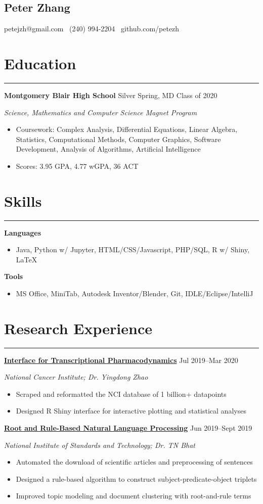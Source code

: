 \documentclass[11pt]{article}
\newcommand{\name}[1]{\begin{center}\section*{\huge \color{highlight} #1}\end{center}}
\newcommand{\topinfo}[1]{\begin{center}\vspace{-0.2cm}#1\vspace{-0.2cm}\end{center}}
\newcommand{\resumesection}[1]{\vspace{-0.3cm}\section*{\color{highlight}#1}\vspace{-0.3cm}\hrule\vspace{0.3cm}}
\begin{document}
\name{Peter Zhang}
\topinfo{petejzh@gmail.com \textbullet\ (240) 994-2204 \textbullet\ github.com/petezh}

\resumesection{Education}

\textbf{Montgomery Blair High School} Silver Spring, MD \hfill Class of 2020 \par
\textit{Science, Mathematics and Computer Science Magnet Program}

\begin{itemize}
	\item Coursework: Complex Analysis, Differential Equations, Linear Algebra, Statistics, Computational Methods, Computer Graphics, Software Development, Analysis of Algorithms, Artificial Intelligence
	\item Scores: 3.95 GPA, 4.77 wGPA, 36 ACT
\end{itemize}


\resumesection{Skills}

\textbf{Languages}
\begin{itemize} 
	\item Java, Python w/ Jupyter, HTML/CSS/Javascript, PHP/SQL, R w/ Shiny, \LaTeX
\end{itemize}\vspace{0.1cm}


\textbf{Tools}
\begin{itemize} 
	\item MS Office, MiniTab, Autodesk Inventor/Blender, Git, IDLE/Eclipse/IntelliJ
\end{itemize}

\resumesection{Research Experience}


\textbf{\href{https://github.com/petezh/TP-Workbench}{Interface for Transcriptional Pharmacodynamics}} \hfill Jul 2019--Mar 2020 \par
\textit{National Cancer Institute; Dr. Yingdong Zhao}
\begin{itemize}
	\item Scraped and reformatted the NCI database of 1 billion+ datapoints
	\item Designed R Shiny interface for interactive plotting and statistical analyses
\end{itemize}\vspace{0.1cm}

\textbf{\href{https://github.com/petezh/Root-and-Rule-NLP}{Root and Rule-Based Natural Language Processing}} \hfill Jun 2019--Sept 2019\par
\textit{National Institute of Standards and Technology; Dr. TN Bhat}
\begin{itemize}
	\item Automated the download of scientific articles and preprocessing of sentences
	\item Designed a rule-based algorithm to construct subject-predicate-object triplets
	\item Improved topic modeling and document clustering with root-and-rule terms
\end{itemize}\vspace{0.1cm}
\end{document}
